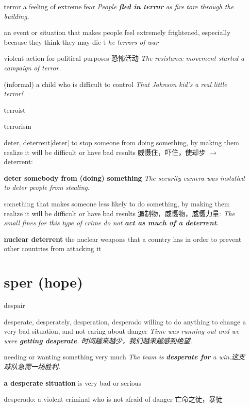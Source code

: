 \begin{DefWord}{terror}
    a feeling of extreme fear
    \textit{People \textbf{fled in terror} as fire tore through the building.}

    an event or situation that makes people feel extremely frightened, especially because they think they may die
    t 
    \textit{he terrors of war}

    violent action for political purposes 恐怖活动
    \textit{The resistance movement started a campaign of terror.}

    (informal) a child who is difficult to control
    \textit{That Johnson kid's a real little terror!}

\end{DefWord}

\begin{DefWord}{terroist}
\end{DefWord}

\begin{DefWord}{terrorism}
\end{DefWord}

\begin{DefWord}{deter, deterrent}[deter]
    to stop someone from doing something, by making them realize it will be difficult or have bad results 威慑住，吓住，使却步 $\rightarrow$  deterrent:

    \textbf{deter somebody from (doing) something}
    \textit{The security camera was installed to deter people from stealing.}

    something that makes someone less likely to do something, by making them realize it will be difficult or have bad results 遏制物，威慑物，威慑力量:
    \textit{The small fines for this type of crime do not \textbf{act as much of a deterrent}.}

    \textbf{nuclear deterrent} the nuclear weapons that a country has in order to prevent other countries from attacking it
\end{DefWord}








\section{sper (hope)}

\begin{DefWord}{despair}
\end{DefWord}

\begin{DefWord}{desperate, desperately, desperation, desperado}
    willing to do anything to change a very bad situation, and not caring about danger
    \textit{Time was running out and we were \textbf{getting desperate}. 时间越来越少，我们越来越感到绝望. }

    needing or wanting something very much
    \textit{The team is \textbf{desperate for} a win.这支球队急需一场胜利. }

    \textbf{a desperate situation} is very bad or serious

    desperado:  a violent criminal who is not afraid of danger 亡命之徒，暴徒
\end{DefWord}


